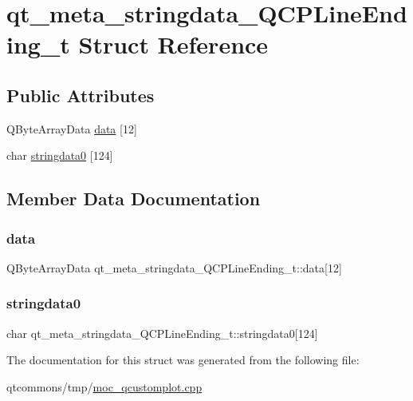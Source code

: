 \hypertarget{structqt__meta__stringdata___q_c_p_line_ending__t}{}\section{qt\+\_\+meta\+\_\+stringdata\+\_\+\+Q\+C\+P\+Line\+Ending\+\_\+t Struct Reference}
\label{structqt__meta__stringdata___q_c_p_line_ending__t}
\subsection*{Public Attributes}
\begin{DoxyCompactItemize}
\item 
Q\+Byte\+Array\+Data \mbox{\hyperlink{structqt__meta__stringdata___q_c_p_line_ending__t_afd1b8860d3c0d66e6e4abf54197c47e6}{data}} \mbox{[}12\mbox{]}
\item 
char \mbox{\hyperlink{structqt__meta__stringdata___q_c_p_line_ending__t_a20c616613071fe30d8f5bcf67c6851b2}{stringdata0}} \mbox{[}124\mbox{]}
\end{DoxyCompactItemize}


\subsection{Member Data Documentation}
\mbox{\label{structqt__meta__stringdata___q_c_p_line_ending__t_afd1b8860d3c0d66e6e4abf54197c47e6}} 
\subsubsection{\texorpdfstring{data}{data}}
{\footnotesize\ttfamily Q\+Byte\+Array\+Data qt\+\_\+meta\+\_\+stringdata\+\_\+\+Q\+C\+P\+Line\+Ending\+\_\+t\+::data\mbox{[}12\mbox{]}}

\mbox{\label{structqt__meta__stringdata___q_c_p_line_ending__t_a20c616613071fe30d8f5bcf67c6851b2}} 
\subsubsection{\texorpdfstring{stringdata0}{stringdata0}}
{\footnotesize\ttfamily char qt\+\_\+meta\+\_\+stringdata\+\_\+\+Q\+C\+P\+Line\+Ending\+\_\+t\+::stringdata0\mbox{[}124\mbox{]}}



The documentation for this struct was generated from the following file\+:\begin{DoxyCompactItemize}
\item 
qtcommons/tmp/\mbox{\hyperlink{moc__qcustomplot_8cpp}{moc\+\_\+qcustomplot.\+cpp}}\end{DoxyCompactItemize}
